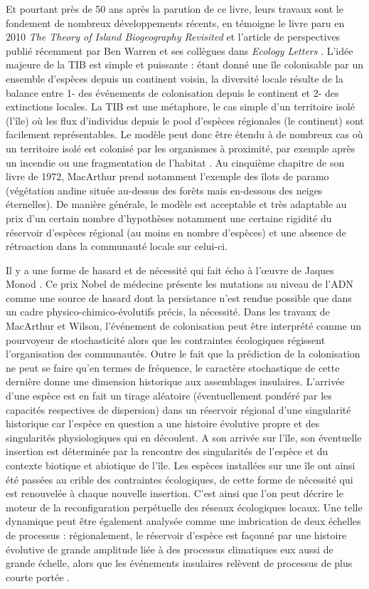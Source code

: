 Et pourtant près de 50 ans après la parution de ce livre, leurs travaux
sont le fondement de nombreux développements récents, en témoigne le
livre paru en 2010 \emph{The Theory of Island Biogeography Revisited}
\citep{Losos2010} et l'article de perspectives publié récemment par Ben
Warren et ses collègues dans \emph{Ecology Letters} \citep{Warren2015}.
L'idée majeure de la TIB est simple et puissante : étant donné une île
colonisable par un ensemble d'espèces depuis un continent voisin, la
diversité locale résulte de la balance entre 1- des événements de
colonisation depuis le continent et 2- des extinctions locales. La TIB
est une métaphore, le cas simple d'un territoire isolé (l'île) où les
flux d'individus depuis le pool d'espèces régionales (le continent) sont
facilement représentables. Le modèle peut donc être étendu à de nombreux
cas où un territoire isolé est colonisé par les organismes à proximité,
par exemple après un incendie ou une fragmentation de l'habitat
\citep{Cook2002}. Au cinquième chapitre de son livre de 1972, MacArthur
prend notamment l'exemple des îlots de paramo (végétation andine située
au-dessus des forêts mais en-dessous des neiges éternelles). De manière
générale, le modèle est acceptable et très adaptable au prix d'un
certain nombre d'hypothèses notamment une certaine rigidité du réservoir
d'espèces régional (au moins en nombre d'espèces) et une absence de
rétroaction dans la communauté locale sur celui-ci.

Il y a une forme de hasard et de nécessité qui fait écho à l'œuvre de
Jaques Monod \citep{monod1970hasard}. Ce prix Nobel de médecine présente
les mutations au niveau de l'ADN comme une source de hasard dont la
persistance n'est rendue possible que dans un cadre
physico-chimico-évolutifs précis, la nécessité. Dans les travaux de
MacArthur et Wilson, l'événement de colonisation peut être interprété
comme un pourvoyeur de stochasticité alors que les contraintes
écologiques régissent l'organisation des communautés. Outre le fait que
la prédiction de la colonisation ne peut se faire qu'en termes de
fréquence, le caractère stochastique de cette dernière donne une
dimension historique aux assemblages insulaires. L'arrivée d'une espèce
est en fait un tirage aléatoire (éventuellement pondéré par les
capacités respectives de dispersion) dans un réservoir régional d'une
singularité historique car l'espèce en question a une histoire évolutive
propre et des singularités physiologiques qui en découlent. A son
arrivée sur l'île, son éventuelle insertion est déterminée par la
rencontre des singularités de l'espèce et du contexte biotique et
abiotique de l'île. Les espèces installées sur une île ont ainsi été
passées au crible des contraintes écologiques, de cette forme de
nécessité qui est renouvelée à chaque nouvelle insertion. C'est ainsi
que l'on peut décrire le moteur de la reconfiguration perpétuelle des
réseaux écologiques locaux. Une telle dynamique peut être également
analysée comme une imbrication de deux échelles de processus :
régionalement, le réservoir d'espèce est façonné par une histoire
évolutive de grande amplitude liée à des processus climatiques eux aussi
de grande échelle, alors que les événements insulaires relèvent de
processus de plus courte portée \citep{Ricklefs1987}.

